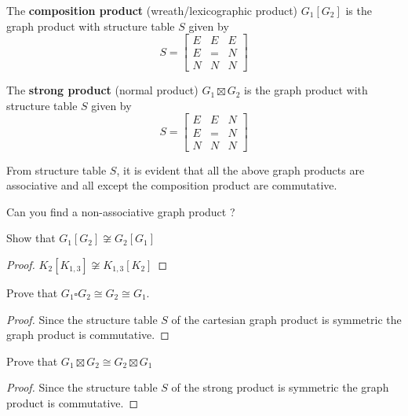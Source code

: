 \begin{definition}
	The \textbf{composition product} (wreath/lexicographic product) $G_1[G_2]$ is the graph product with structure table $S$ given by
	$$ S = \begin{bmatrix} E & E & E \\ E & = & N \\ N & N & N \end{bmatrix} $$
\end{definition}

\begin{definition}
	The \textbf{strong product} (normal product) $G_1 \boxtimes G_2$ is the graph product with structure table $S$ given by
	$$ S = \begin{bmatrix} E & E & N \\ E & = & N \\ N & N & N \end{bmatrix} $$
\end{definition}

\begin{remark}
	From structure table $S$, it is evident that all the above graph products are associative and all except the composition product are commutative.
\end{remark}

\begin{challenge}
	Can you find a non-associative graph product ?
\end{challenge}

\begin{exercise}
	Show that $G_1[G_2] \not\cong G_2[G_1]$
\end{exercise}
\begin{proof}
	$K_2[K_{1,3}] \not\cong K_{1,3}[K_2]$
\end{proof}

\begin{exercise}
	Prove that $G_1 \square G_2 \cong G_2 \cong G_1$.
\end{exercise}
\begin{proof}
	Since the structure table $S$ of the cartesian graph product is symmetric the graph product is commutative.
\end{proof}

\begin{exercise}
	Prove that $G_1 \boxtimes G_2 \cong G_2 \boxtimes G_1$
\end{exercise}
\begin{proof}
	Since the structure table $S$ of the strong product is symmetric the graph product is commutative.
\end{proof}

